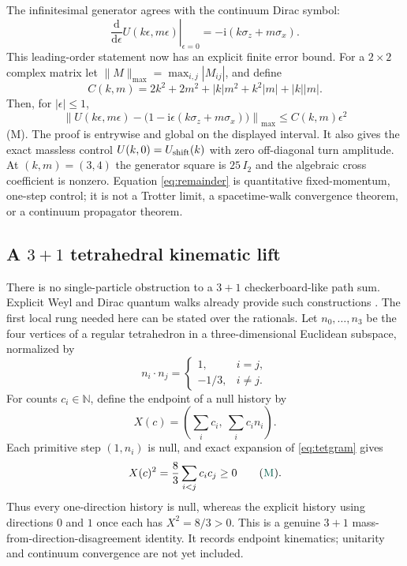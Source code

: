 \documentclass[11pt]{article}
\newcommand{\Mtag}{\textcolor{verified}{\textsc{M}}}
\newcommand{\dd}{\mathrm{d}}
\newcommand{\ii}{\mathrm{i}}
\newcommand{\N}{\mathbb{N}}
\begin{document}
The infinitesimal generator agrees with the continuum Dirac symbol:
\begin{equation}\label{eq:generator}
 \left.\frac{\dd}{\dd\epsilon}U(k\epsilon,m\epsilon)\right|_{\epsilon=0}
 =-\ii(k\sigma_z+m\sigma_x).
\end{equation}
This leading-order statement now has an explicit finite error bound.  For a
$2\times2$ complex matrix let
$\lVert M\rVert_{\max}=\max_{i,j}|M_{ij}|$, and define
\begin{equation}\label{eq:remainderconstant}
 C(k,m)=2k^2+2m^2+|k|m^2+k^2|m|+|k||m|.
\end{equation}
Then, for $|\epsilon|\leq1$,
\begin{equation}\label{eq:remainder}
 \left\lVert U(k\epsilon,m\epsilon)
 -\bigl(1-\ii\epsilon(k\sigma_z+m\sigma_x)\bigr)\right\rVert_{\max}
 \leq C(k,m)\epsilon^2
\end{equation}
(\Mtag).  The proof is entrywise and global on the displayed interval.  It also
gives the exact massless control $U(k,0)=U_{\rm shift}(k)$ with zero
off-diagonal turn amplitude.  At $(k,m)=(3,4)$ the generator square is
$25\,I_2$ and the algebraic cross coefficient is nonzero.  Equation
\eqref{eq:remainder} is quantitative fixed-momentum, one-step control; it is
not a Trotter limit, a spacetime-walk convergence theorem, or a continuum
propagator theorem.

\subsection{A $3+1$ tetrahedral kinematic lift}

There is no single-particle obstruction to a $3+1$ checkerboard-like path
sum.  Explicit Weyl and Dirac quantum walks already provide such constructions
\cite{FosterJacobson,DarianoWeyl,NzonganiTetra}.  The first local rung needed
here can be stated over the rationals.  Let $n_0,\ldots,n_3$ be the four
vertices of a regular tetrahedron in a three-dimensional Euclidean subspace,
normalized by
\begin{equation}\label{eq:tetgram}
 n_i\mathbin{\cdot}n_j=
 \begin{cases}1,&i=j,\\-1/3,&i\ne j.\end{cases}
\end{equation}
For counts $c_i\in\N$, define the endpoint of a null history by
\begin{equation}\label{eq:tetendpoint}
 X(c)=\left(\sum_i c_i,\ \sum_i c_i n_i\right).
\end{equation}
Each primitive step $(1,n_i)$ is null, and exact expansion of
\eqref{eq:tetgram} gives
\begin{equation}\label{eq:tetmass}
 X(c)^2=\frac{8}{3}\sum_{i<j}c_i c_j\geq0
 \qquad(\Mtag).
\end{equation}
Thus every one-direction history is null, whereas the explicit history using
directions $0$ and $1$ once each has $X^2=8/3>0$.  This is a genuine $3+1$
mass-from-direction-disagreement identity.  It records endpoint kinematics;
unitarity and continuum convergence are not yet included.
\end{document}
